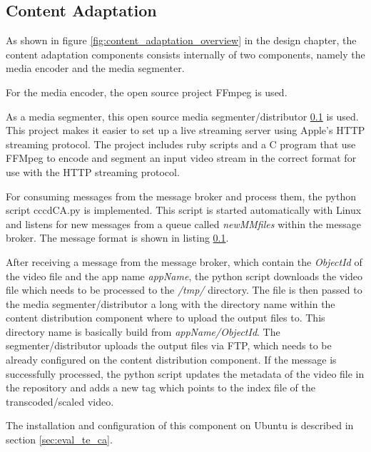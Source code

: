 \subsection{Content Adaptation\label{sec:des_ar_ov}}
As shown in figure \ref{fig:content_adaptation_overview} in the design chapter, the content adaptation components consists internally of two components, namely the media encoder and the media segmenter. 

For the media encoder, the open source project FFmpeg is used. 

As a media segmenter, this open source media segmenter/distributor \ref{} is used. This project makes it easier to set up a live streaming server using Apple's HTTP streaming protocol. The project includes ruby scripts and a C program that use FFMpeg to encode and segment an input video stream in the correct format for use with the HTTP streaming protocol.

For consuming messages from the message broker and process them, the python script cccdCA.py is implemented. This script is started automatically with Linux and listens for new messages from a queue called \textit{newMMfiles} within the message broker. The message format is shown in listing \ref{}. 

After receiving a message from the message broker, which contain the \textit{ObjectId} of the video file and the app name \textit{appName}, the python script downloads the video file which needs to be processed to the \textit{/tmp/} directory. The file is then passed to the media segmenter/distributor a long with the directory name within the content distribution component where to upload the output files to. This directory name is basically build from \textit{appName/ObjectId}. The segmenter/distributor uploads the output files via FTP, which needs to be already configured on the content distribution component. If the message is successfully processed, the python script updates the metadata of the video file in the repository and adds a new tag which points to the index file of the transcoded/scaled video.

The installation and configuration of this component on Ubuntu is described in section \ref{sec:eval_te_ca}.
	
